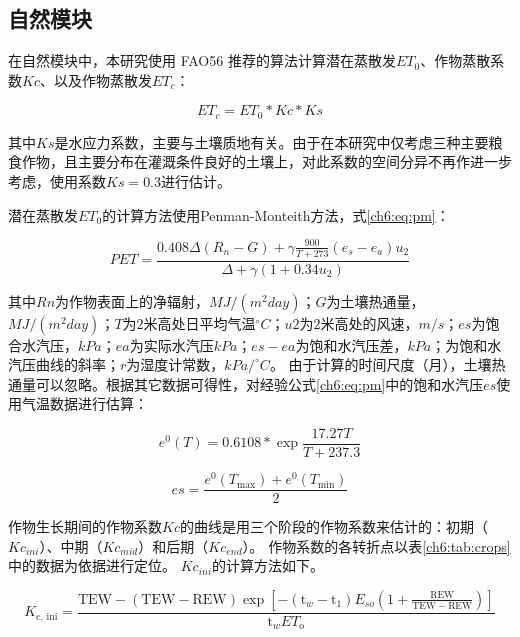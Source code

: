 \subsection{自然模块}

在自然模块中，本研究使用 FAO56 推荐的算法计算潜在蒸散发$ET_0$、作物蒸散系数$Kc$、以及作物蒸散发$ET_c$：

\begin{equation}
    ET_c = ET_0 * Kc * Ks
\end{equation}

其中$Ks$是水应力系数，主要与土壤质地有关。由于在本研究中仅考虑三种主要粮食作物，且主要分布在灌溉条件良好的土壤上，对此系数的空间分异不再作进一步考虑，使用系数$Ks = 0.3$进行估计。  %

潜在蒸散发$ET_0$的计算方法使用Penman-Monteith方法，式\ref{ch6:eq:pm}：

\begin{equation}
    \label{ch6:eq:pm}
    PET = \frac{0.408 \Delta (R_{n}-G)+\gamma \frac{900}{T+273}
    (e_s-e_a) u_2}{\Delta+\gamma(1+0.34 u_2)}
\end{equation}

其中$Rn$为作物表面上的净辐射，$MJ/(m^2 day)$；$G$为土壤热通量，$MJ/(m^2 day)$；$T$为$2$米高处日平均气温$^\circ C$；$u2$为$2$米高处的风速，$m/s$；$es$为饱合水汽压，$kPa$；$ea$为实际水汽压$kPa$；$es - ea$为饱和水汽压差，$kPa$；为饱和水汽压曲线的斜率；$r$为湿度计常数，$kPa/^\circ C$。
由于计算的时间尺度（月），土壤热通量可以忽略。根据其它数据可得性，对经验公式\ref{ch6:eq:pm}中的饱和水汽压$es$使用气温数据进行估算：

\begin{equation}
    e^0(T) = 0.6108 * \exp \frac{17.27 T}{T + 237.3}
\end{equation}

\begin{equation}
    es = \frac{e^0(T_{\max}) + e^0(T_{\min})}{2}
\end{equation}

作物生长期间的作物系数$Kc$的曲线是用三个阶段的作物系数来估计的：初期（$Kc_{ini}$）、中期（$Kc_{mid}$）和后期（$Kc_{end}$）。
作物系数的各转折点以表\ref{ch6:tab:crops}中的数据为依据进行定位。
$Kc_{ini}$的计算方法如下\cite{allen1998}。

\begin{equation}
    \label{ch6:eq:kcini}
    K_{\text {c, ini}}=\frac{\mathrm{TEW}-(\mathrm{TEW}-\mathrm{REW}) \exp \left[-\left(\mathrm{t}_w-\mathrm{t}_1\right) E_{so}\left(1+\frac{\mathrm{REW}}{\mathrm{TEW}-\mathrm{REW}}\right)\right]}{\mathrm{t}_w E T_{\mathrm{o}}}
\end{equation}

